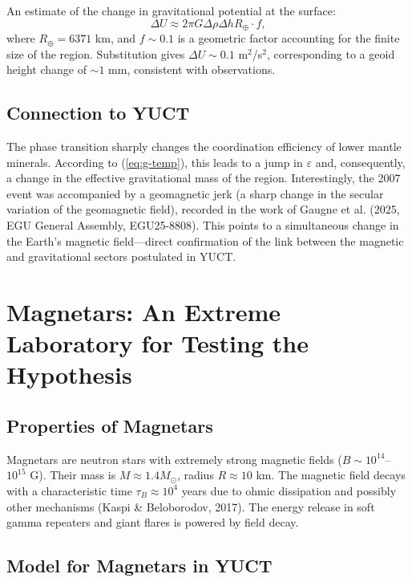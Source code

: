 \documentclass[12pt]{article}
\theoremstyle{remark}
\newcommand{\eps}{\varepsilon}
\begin{document}
	An estimate of the change in gravitational potential at the surface:
	\begin{equation}
		\Delta U \approx 2\pi G \Delta\rho \Delta h R_\oplus \cdot f,
		\label{eq:delta-u}
	\end{equation}
	where $R_\oplus = 6371$ km, and $f \sim 0.1$ is a geometric factor accounting for the finite size of the region. Substitution gives $\Delta U \sim 0.1$ m$^2$/s$^2$, corresponding to a geoid height change of $\sim 1$ mm, consistent with observations.
	
	\subsection{Connection to YUCT}
	\label{subsec:grace-yuct}
	
	The phase transition sharply changes the coordination efficiency of lower mantle minerals. According to (\ref{eq:g-temp}), this leads to a jump in $\eps$ and, consequently, a change in the effective gravitational mass of the region. Interestingly, the 2007 event was accompanied by a geomagnetic jerk (a sharp change in the secular variation of the geomagnetic field), recorded in the work of Gaugne et al. (2025, EGU General Assembly, EGU25-8808). This points to a simultaneous change in the Earth's magnetic field—direct confirmation of the link between the magnetic and gravitational sectors postulated in YUCT.
	
	\section{Magnetars: An Extreme Laboratory for Testing the Hypothesis}
	\label{sec:magnetars}
	
	\subsection{Properties of Magnetars}
	\label{subsec:magnetars-properties}
	
	Magnetars are neutron stars with extremely strong magnetic fields ($B \sim 10^{14}$–$10^{15}$ G). Their mass is $M \approx 1.4 M_\odot$, radius $R \approx 10$ km. The magnetic field decays with a characteristic time $\tau_B \approx 10^4$ years due to ohmic dissipation and possibly other mechanisms (Kaspi \& Beloborodov, 2017). The energy release in soft gamma repeaters and giant flares is powered by field decay.
	
	\subsection{Model for Magnetars in YUCT}
	\label{subsec:magnetars-model}
	
\end{document}
